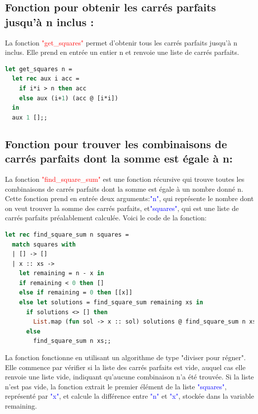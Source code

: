 \documentclass{article}
\begin{document}
\subsection{Fonction pour obtenir les carrés parfaits jusqu'à n inclus :}

La fonction \textcolor{red}{"get\_squares"} permet d'obtenir tous les carrés parfaits jusqu'à n inclus. Elle prend en entrée un entier n et renvoie une liste de carrés parfaits.



\begin{lstlisting}[language=Caml]
let get_squares n =
  let rec aux i acc =
    if i*i > n then acc
    else aux (i+1) (acc @ [i*i])
  in
  aux 1 [];;
\end{lstlisting}
\newpage

\subsection{Fonction pour trouver les combinaisons de carrés parfaits dont la somme est égale à n:}

La fonction \textcolor{red}{"find\_square\_sum"} est une fonction récursive qui trouve toutes les combinaisons de carrés parfaits dont la somme est égale à un nombre donné n. Cette fonction prend en entrée deux arguments:\textcolor{blue}{"n"}, qui représente le nombre dont on veut trouver la somme des carrés parfaits, et\textcolor{blue}{"squares"}, qui est une liste de carrés parfaits préalablement calculée. Voici le code de la fonction:\newline

\begin{lstlisting}[language=Caml]
let rec find_square_sum n squares =
  match squares with
  | [] -> []
  | x :: xs ->
    let remaining = n - x in
    if remaining < 0 then []
    else if remaining = 0 then [[x]]
    else let solutions = find_square_sum remaining xs in
      if solutions <> [] then
        List.map (fun sol -> x :: sol) solutions @ find_square_sum n xs
      else
        find_square_sum n xs;;
\end{lstlisting}

La fonction fonctionne en utilisant un algorithme de type "diviser pour régner". Elle commence par vérifier si la liste des carrés parfaits est vide, auquel cas elle renvoie une liste vide, indiquant qu'aucune combinaison n'a été trouvée. Si la liste n'est pas vide, la fonction extrait le premier élément de la liste \textcolor{blue}{"squares"}, représenté par \textcolor{blue}{"x"}, et calcule la différence entre \textcolor{blue}{"n"} et \textcolor{blue}{"x"}, stockée dans la variable remaining.\newline
\end{document}
